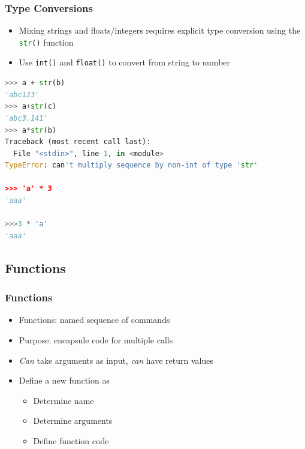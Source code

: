 \documentclass[english]{beamer}
\begin{document}
\begin{frame}[containsverbatim]
\frametitle{Type Conversions}

\begin{itemize}
\item Mixing strings and floats/integers requires explicit type conversion using the \lstinline[language={Python}]{str()} function
\item Use \texttt{int()} and \texttt{float()} to convert from string to number
\end{itemize}

\begin{lstlisting}[language={Python}]
>>> a + str(b)
'abc123'
>>> a+str(c)
'abc3.141'
>>> a*str(b)
Traceback (most recent call last):
  File "<stdin>", line 1, in <module>
TypeError: can't multiply sequence by non-int of type 'str'

>>> 'a' * 3
'aaa'

>>>3 * 'a'
'aaa'
\end{lstlisting}


\end{frame}

\subsection{Functions}


\begin{frame}
\frametitle{Functions}

\begin{itemize}
\item Functions: named sequence of commands
\item Purpose: encapsule code for multiple calls
\item \textit{Can} take arguments as input, \textit{can} have return values
\item Define a new function as
\begin{itemize}
	\item Determine name
	\item Determine arguments
	\item Define function code
	\end{itemize}
\end{itemize}
\end{frame}
\end{document}

